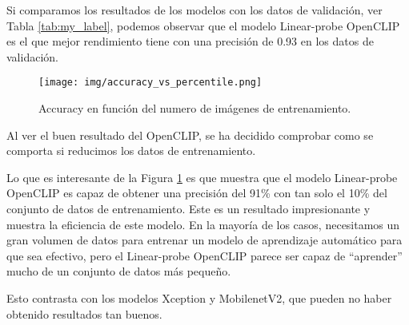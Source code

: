 \documentclass[10pt,a4paper,twocolumn,twoside]{article}
\begin{document}
Si comparamos los resultados de los modelos con los datos de validación, ver Tabla \ref{tab:my_label},
podemos observar que el modelo Linear-probe OpenCLIP es el que mejor rendimiento
tiene con una precisión de 0.93 en los datos de validación.

\begin{figure}[h]
  \centering
  \texttt{[image: img/accuracy\_vs\_percentile.png]}
  \caption{Accuracy en función del numero de imágenes de entrenamiento.}
  \label{fig:accuracy_vs_percentile}
\end{figure}

Al ver el buen resultado del OpenCLIP, se ha decidido comprobar como se comporta si reducimos los datos de entrenamiento.

Lo que es interesante de la Figura \ref{fig:accuracy_vs_percentile} es que muestra que el modelo Linear-probe OpenCLIP es capaz de obtener una precisión del 91\% con tan solo el 10\% del conjunto de datos de entrenamiento. Este es un resultado impresionante y muestra la eficiencia de este modelo. En la mayoría de los casos, necesitamos un gran volumen de datos para entrenar un modelo de aprendizaje automático para que sea efectivo, pero el Linear-probe OpenCLIP parece ser capaz de ``aprender'' mucho de un conjunto de datos más pequeño.

Esto contrasta con los modelos Xception y MobilenetV2, que pueden no haber obtenido resultados tan buenos.
\end{document}
